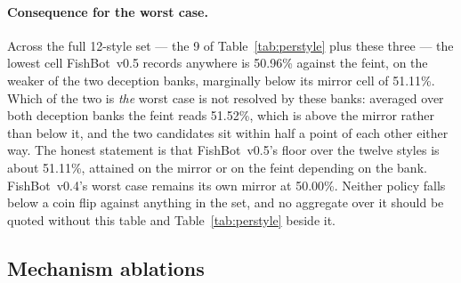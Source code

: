 \documentclass[11pt]{article}
\theoremstyle{definition}
\DeclareRobustCommand{\vfive}{\texorpdfstring{\mbox{FishBot v0.5}}{FishBot v0.5}}
\DeclareRobustCommand{\vfour}{\texorpdfstring{\mbox{FishBot v0.4}}{FishBot v0.4}}
\providecommand{\numVfiveWorst}{51.11}
\providecommand{\numVfourWorst}{50.00}
\providecommand{\numDecFeintFive}{51.52}
\providecommand{\numDecWorst}{50.96}
\providecommand{\numDecWorstOpp}{feint}
\providecommand{\numVfiveStyleN}{9}
\providecommand{\numTwelveStyles}{12}
\begin{document}
\paragraph{Consequence for the worst case.} Across the full
\numTwelveStyles{}-style set --- the \numVfiveStyleN{} of
Table~\ref{tab:perstyle} plus these three --- the lowest cell \vfive{} records
anywhere is \numDecWorst\% against the \numDecWorstOpp{}, on the weaker of the
two deception banks, marginally below its mirror cell of \numVfiveWorst\%.
Which of the two is \emph{the} worst case is not resolved by these banks:
averaged over both deception banks the \numDecWorstOpp{} reads
\numDecFeintFive\%, which is above the mirror rather than below it, and the two
candidates sit within half a point of each other either way. The honest
statement is that \vfive{}'s floor over the twelve styles is about
\numVfiveWorst\%, attained on the mirror or on the \numDecWorstOpp{} depending on
the bank. \vfour{}'s worst case remains its own mirror at \numVfourWorst\%.
Neither policy falls below a coin flip against anything in the set, and no
aggregate over it should be quoted without this table and
Table~\ref{tab:perstyle} beside it.

\subsection{Mechanism ablations}
\label{sec:results-ablations}
\end{document}
